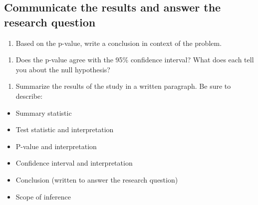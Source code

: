\documentclass[
]{report}
\providecommand{\tightlist}{%
  \setlength{\itemsep}{0pt}\setlength{\parskip}{0pt}}
\begin{document}
\vspace{1in}

\hypertarget{communicate-the-results-and-answer-the-research-question}{%
\subsection*{Communicate the results and answer the research question}\label{communicate-the-results-and-answer-the-research-question}}

\begin{enumerate}
\def\labelenumi{\arabic{enumi}.}
\setcounter{enumi}{17}
\tightlist
\item
  Based on the p-value, write a conclusion in context of the problem.
\end{enumerate}

\vspace{1in}

\begin{enumerate}
\def\labelenumi{\arabic{enumi}.}
\setcounter{enumi}{18}
\tightlist
\item
  Does the p-value agree with the 95\% confidence interval? What does each tell you about the null hypothesis?
\end{enumerate}

\vspace{1in}

\begin{enumerate}
\def\labelenumi{\arabic{enumi}.}
\setcounter{enumi}{19}
\tightlist
\item
  Summarize the results of the study in a written paragraph. Be sure to describe:
\end{enumerate}

\begin{itemize}
\item
  Summary statistic
\item
  Test statistic and interpretation
\item
  P-value and interpretation
\item
  Confidence interval and interpretation
\item
  Conclusion (written to answer the research question)
\item
  Scope of inference
\end{itemize}

\vspace{3in}

\newpage
\end{document}
